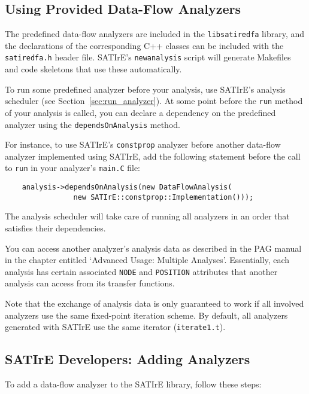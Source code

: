 \documentclass[a4paper,12pt]{report}
\begin{document}
\subsection{Using Provided Data-Flow Analyzers}
\label{sec:analysis_dataflow_use}

The predefined data-flow analyzers are included in the \texttt{libsatiredfa}
library, and the declarations of the corresponding C++ classes can be
included with the \texttt{satiredfa.h} header file. SATIrE's
\texttt{newanalysis} script will generate Makefiles and code skeletons that
use these automatically.

To run some predefined analyzer before your analysis, use SATIrE's analysis
scheduler (see Section~\ref{sec:run_analyzer}). At some point before the
\texttt{run} method of your analysis is called, you can declare a dependency
on the predefined analyzer using the \texttt{dependsOnAnalysis} method.

For instance, to use SATIrE's \texttt{constprop} analyzer before another
data-flow analyzer implemented using SATIrE, add the following statement
before the call to \texttt{run} in your analyzer's \texttt{main.C} file:

\begin{verbatim}
    analysis->dependsOnAnalysis(new DataFlowAnalysis(
                new SATIrE::constprop::Implementation()));
\end{verbatim}

The analysis scheduler will take care of running all analyzers in an order
that satisfies their dependencies.

You can access another analyzer's analysis data as described in the PAG
manual in the chapter entitled `Advanced Usage: Multiple Analyses'.
Essentially, each analysis has certain associated \texttt{NODE} and
\texttt{POSITION} attributes that another analysis can access from its
transfer functions.

Note that the exchange of analysis data is only guaranteed to work if all
involved analyzers use the same fixed-point iteration scheme. By default,
all analyzers generated with SATIrE use the same iterator
(\texttt{iterate1.t}).

\subsection{SATIrE Developers: Adding Analyzers}
\label{sec:analysis_dataflow_add}

To add a data-flow analyzer to the SATIrE library, follow these steps:
\end{document}
